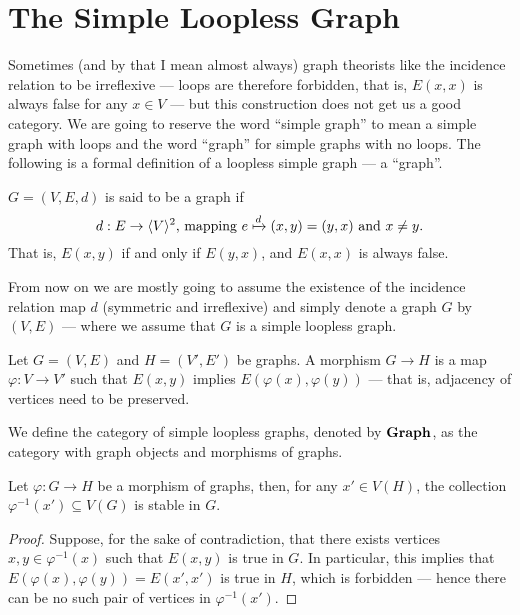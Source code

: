 \section{The Simple Loopless Graph}

Sometimes (and by that I mean almost always) graph theorists like the incidence
relation to be irreflexive --- loops are therefore forbidden, that is, \(E(x, x)\)
is always false for any \(x \in V\) --- but this construction does not get us a
good category. We are going to reserve the word ``simple graph'' to mean a simple
graph with loops and the word ``graph'' for simple graphs with no loops. The
following is a formal definition of a loopless simple graph --- a ``graph''.

\begin{definition}[Graph]\label{def: graph}
\(G = (V, E, d)\) is said to be a graph if
\[
  d: E \to \langle V \rangle^2 \text{, mapping } e \xmapsto d (x, y) = (y, x)
  \text{ and } x \neq y.
\]
That is, \(E(x, y)\) if and only if \(E(y, x)\), and \(E(x, x)\) is always
false.
\end{definition}

From now on we are mostly going to assume the existence of the incidence
relation map \(d\) (symmetric and irreflexive) and simply denote a graph \(G\)
by \((V, E)\) --- where we assume that \(G\) is a simple loopless graph.

\begin{definition}\label{def: graph-morph}
Let \(G = (V, E)\) and \(H = (V', E')\) be graphs. A morphism \(G \to H\) is a
map \(\varphi: V \to V'\) such that \(E(x, y)\) implies \(E(\varphi(x),
\varphi(y))\) --- that is, adjacency of vertices need to be preserved.
\end{definition}

\begin{definition}\label{def: graph-cat}
We define the category of simple loopless graphs, denoted by \({\textbf{Graph}}\), as
the category with graph objects and morphisms of graphs.
\end{definition}

\begin{lemma}\label{lem: stable-preimage}
Let \(\varphi: G \to H\) be a morphism of graphs, then, for any \(x' \in
V(H)\), the collection \(\varphi^{-1}(x') \subseteq V(G)\) is stable in \(G\).
\end{lemma}

\begin{proof}
Suppose, for the sake of contradiction, that there exists vertices \(x, y \in
\varphi^{-1}(x)\) such that \(E(x, y)\) is true in \(G\). In particular, this
implies that \(E(\varphi(x), \varphi(y)) = E(x', x')\) is true in \(H\), which
is forbidden --- hence there can be no such pair of vertices in
\(\varphi^{-1}(x')\).
\end{proof}

